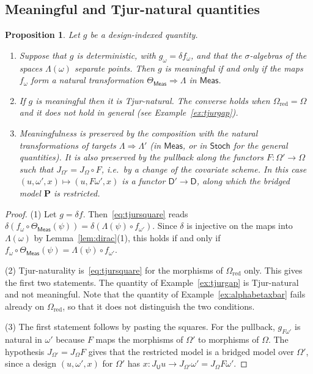 \documentclass[11pt,a4paper]{article}
\theoremstyle{plain}
\newtheorem{proposition}[theorem]{Proposition}
\theoremstyle{definition}
\theoremstyle{remark}
\newcommand{\cat}[1]{\mathsf{#1}}
\newcommand{\catU}{\cat{U}}
\newcommand{\catO}{\cat{\Omega}}
\newcommand{\catD}{\cat{D}}
\newcommand{\Meas}{\cat{Meas}}
\newcommand{\Stoch}{\cat{Stoch}}
\newcommand{\del}{\delta}
\begin{document}
\subsection{Meaningful and Tjur-natural quantities}

\begin{proposition}\label{prop:tjur}
Let $g$ be a design-indexed quantity.
\begin{enumerate}
\item Suppose that $g$ is deterministic, with $g_\omega = \del f_\omega$, and
that the $\sigma$-algebras of the spaces $\Lambda(\omega)$ separate points.
Then $g$ is meaningful if and only if the maps $f_\omega$ form a natural
transformation $\Theta_\Meas \Rightarrow \Lambda$ in $\Meas$.
\item If $g$ is meaningful then it is Tjur-natural. The converse holds when
$\catO_{\mathrm{red}} = \catO$ and it does not hold in general (see
Example~\ref{ex:tjurgap}).
\item Meaningfulness is preserved by the composition with the natural
transformations of targets $\Lambda \Rightarrow \Lambda'$ (in $\Meas$, or in
$\Stoch$ for the general quantities). It is also preserved by the pullback
along the functors $F \colon \catO' \to \catO$ such that
$J_{\catO'} = J_{\catO} \circ F$, i.e.\ by a change of the covariate scheme. In
this case $(u,\omega',x) \mapsto (u,F\omega',x)$ is a functor
$\catD' \to \catD$, along which the bridged model $\mathbf{P}$ is restricted.
\end{enumerate}
\end{proposition}

\begin{proof}
(1) Let $g = \del f$. Then~\eqref{eq:tjursquare} reads
$\del(f_\omega \circ \Theta_\Meas(\psi)) = \del(\Lambda(\psi) \circ
f_{\omega'})$. Since $\del$ is injective on the maps into $\Lambda(\omega)$ by
Lemma~\ref{lem:dirac}(1), this holds if and only if
$f_\omega \circ \Theta_\Meas(\psi) = \Lambda(\psi) \circ f_{\omega'}$.

(2) Tjur-naturality is~\eqref{eq:tjursquare} for the morphisms of
$\catO_{\mathrm{red}}$ only. This gives the first two statements. The quantity
of Example~\ref{ex:tjurgap} is Tjur-natural and not meaningful. Note that the
quantity of Example~\ref{ex:alphabetaxbar} fails already on
$\catO_{\mathrm{red}}$, so that it does not distinguish the two conditions.

(3) The first statement follows by pasting the squares. For the pullback,
$g_{F\omega'}$ is natural in $\omega'$ because $F$ maps the morphisms of
$\catO'$ to morphisms of $\catO$. The hypothesis $J_{\catO'} = J_{\catO}F$
gives that the restricted model is a bridged model over $\catO'$, since a
design $(u,\omega',x)$ for $\catO'$ has
$x \colon J_{\catU}u \to J_{\catO'}\omega' = J_{\catO}F\omega'$.
\end{proof}
\end{document}
